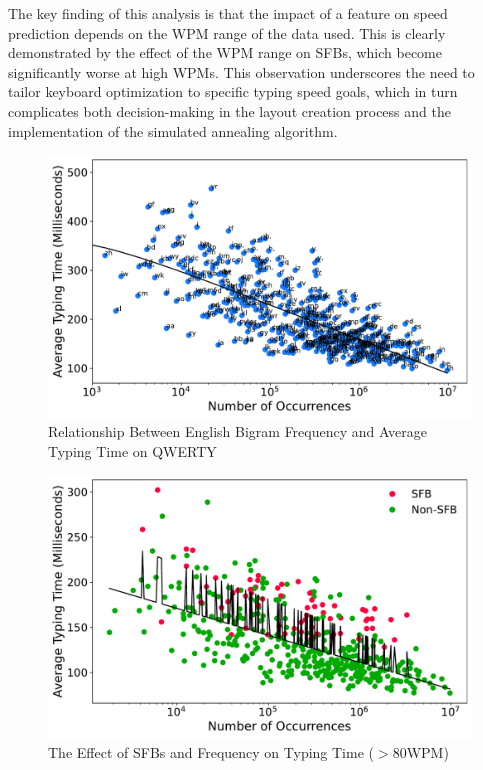 \noindent The key finding of this analysis is that the impact of a feature on speed prediction depends on the WPM range of the data used. This is clearly demonstrated by the effect of the WPM range on SFBs, which become significantly worse at high WPMs. This observation underscores the need to tailor keyboard optimization to specific typing speed goals, which in turn complicates both decision-making in the layout creation process and the implementation of the simulated annealing algorithm.

\begin{figure}[h]
\includegraphics[width=\columnwidth]{figures/freqplot.pdf}
\caption{Relationship Between English Bigram Frequency and Average Typing Time on QWERTY}
\label{fig:freq_to_time}
\end{figure}

\begin{figure}[h]
\includegraphics[width=\columnwidth]{figures/sfbplot.pdf}
\caption{The Effect of SFBs and Frequency on Typing Time ($>80$WPM)}
\label{fig:bigram_typing_time}
\end{figure}

